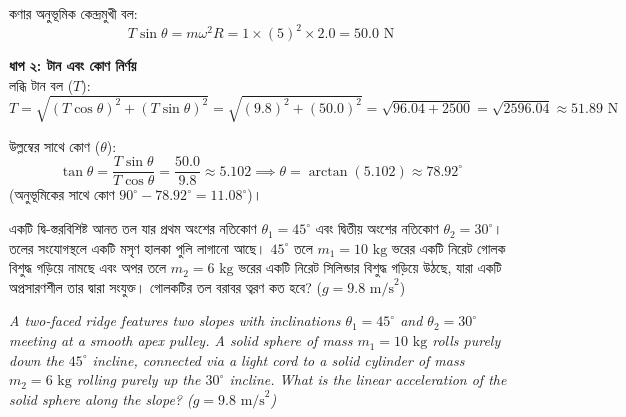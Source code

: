\documentclass[12pt, a4paper]{article}
\begin{document}
{{\begin{tcolorbox}[solutionbox={সমাধান (Solution)}]
    কণার অনুভূমিক কেন্দ্রমুখী বল:
    \[ T \sin\theta = m \omega^2 R = 1 \times (5)^2 \times 2.0 = 50.0\text{ N} \]
    
    \vspace{0.5em}
    \noindent\textbf{ধাপ ২: টান এবং কোণ নির্ণয়} \\
    লব্ধি টান বল ($T$):
    \[ T = \sqrt{(T \cos\theta)^2 + (T \sin\theta)^2} = \sqrt{(9.8)^2 + (50.0)^2} = \sqrt{96.04 + 2500} = \sqrt{2596.04} \approx \mathbf{51.89}\text{ N} \]
    
    উল্লম্বের সাথে কোণ ($\theta$):
    \[ \tan\theta = \frac{T \sin\theta}{T \cos\theta} = \frac{50.0}{9.8} \approx 5.102 \implies \theta = \arctan(5.102) \approx 78.92^\circ \]
    (অনুভূমিকের সাথে কোণ $90^\circ - 78.92^\circ = \mathbf{11.08^\circ}$)।
\end{tcolorbox}

\newpage

\begin{tcolorbox}[questionbox={প্রশ্ন (Question) 23}]
    \noindent
    একটি দ্বি-স্তরবিশিষ্ট আনত তল যার প্রথম অংশের নতিকোণ $\theta_1 = 45^\circ$ এবং দ্বিতীয় অংশের নতিকোণ $\theta_2 = 30^\circ$। তলের সংযোগস্থলে একটি মসৃণ হালকা পুলি লাগানো আছে। $45^\circ$ তলে $m_1 = 10\text{ kg}$ ভরের একটি নিরেট গোলক বিশুদ্ধ গড়িয়ে নামছে এবং অপর তলে $m_2 = 6\text{ kg}$ ভরের একটি নিরেট সিলিন্ডার বিশুদ্ধ গড়িয়ে উঠছে, যারা একটি অপ্রসারণশীল তার দ্বারা সংযুক্ত। গোলকটির তল বরাবর ত্বরণ কত হবে? ($g = 9.8\text{ m/s}^2$)
    
    \vspace{0.8em}
    \begin{english}
    \noindent\textit{\color{darkgray}
    A two-faced ridge features two slopes with inclinations $\theta_1 = 45^\circ$ and $\theta_2 = 30^\circ$ meeting at a smooth apex pulley. A solid sphere of mass $m_1 = 10\text{ kg}$ rolls purely down the $45^\circ$ incline, connected via a light cord to a solid cylinder of mass $m_2 = 6\text{ kg}$ rolling purely up the $30^\circ$ incline. What is the linear acceleration of the solid sphere along the slope? ($g = 9.8\text{ m/s}^2$)
    }
    \end{english}
\end{tcolorbox}

\vspace{1em}
\begin{center}
\end{center}}}
\end{document}
